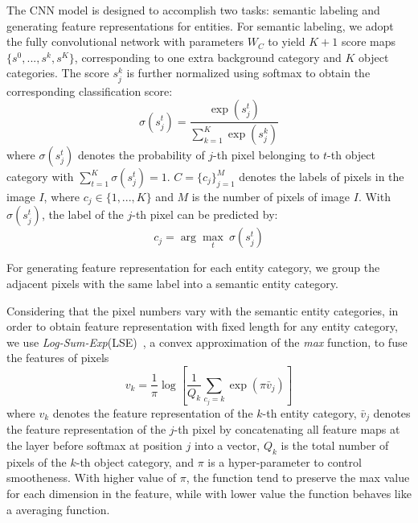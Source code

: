\documentclass[10pt,twocolumn,letterpaper]{article}
\begin{document}
The CNN model is designed to accomplish two tasks: semantic labeling and generating feature representations for entities. For semantic labeling, we adopt the fully convolutional network with parameters $W_C$ to yield $K+1$ score maps $\{{s}^0, ..., {s}^k, {s}^K\}$, corresponding to one extra background category and $K$ object categories. The score $s_j^k$ is further normalized using softmax to obtain the corresponding classification score:
\begin{equation}\label{eq_softmax}
\sigma(s_j^t) = \frac{\exp(s_j^t)} {\sum_{k=1}^K \exp(s_j^k)}
\end{equation}
where $\sigma(s_j^t)$ denotes the probability of $j$-th pixel belonging to $t$-th object category with $\sum_{t=1}^K \sigma(s_j^t)=1$. $C=\{c_j\}_{j=1}^M$ denotes the labels of pixels in the image $I$, where $c_j\in \{1,...,K\}$ and $M$ is the number of pixels of image $I$. With $\sigma(s_j^t)$, the label of the $j$-th pixel can be predicted by:
\begin{equation}\label{eq_prediction}
c_j = \arg\max_t \: \sigma(s_j^t)
\end{equation}

For generating feature representation for each entity category, we group the adjacent pixels with the same label into a semantic entity category.

Considering that the pixel numbers vary with the semantic entity categories, in order to obtain feature representation with fixed length for any entity category, we use \textit{Log-Sum-Exp}(LSE)~\cite{boyd2004convex}, a convex approximation of the \textit{max} function, to fuse the features of pixels
\begin{equation}\label{eq_feature}
v_k = \frac{1}{\pi}\log \left[\frac{1}{Q_k}\sum_{c_j = k} \exp (\pi \bar{v}_j) \right]
\end{equation}
where $v_k$ denotes the feature representation of the $k$-th entity category, $\bar{v}_j$ denotes the feature representation of the $j$-th pixel by concatenating all feature maps at the layer before softmax at position $j$ into a vector, $Q_k$ is the total number of pixels of the $k$-th object category, and $\pi$ is a hyper-parameter to control smootheness. With higher value of $\pi$, the function tend to preserve the max value for each dimension in the feature, while with lower value the function behaves like a averaging function.



\iffalse
\fi
\end{document}
